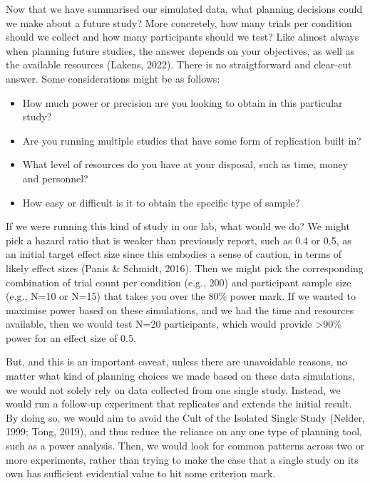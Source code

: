 \documentclass[
  english,
  man, donotrepeattitle,floatsintext]{apa6}
\providecommand{\tightlist}{%
  \setlength{\itemsep}{0pt}\setlength{\parskip}{0pt}}
\begin{document}
Now that we have summarised our simulated data, what planning decisions could we make about a future study?
More concretely, how many trials per condition should we collect and how many participants should we test?
Like almost always when planning future studies, the answer depends on your objectives, as well as the available resources (Lakens, 2022).
There is no straigtforward and clear-cut answer.
Some considerations might be as follows:

\begin{itemize}
\tightlist
\item
  How much power or precision are you looking to obtain in this particular study?
\item
  Are you running multiple studies that have some form of replication built in?
\item
  What level of resources do you have at your disposal, such as time, money and personnel?
\item
  How easy or difficult is it to obtain the specific type of sample?
\end{itemize}

If we were running this kind of study in our lab, what would we do?
We might pick a hazard ratio that is weaker than previously report, such as 0.4 or 0.5, as an initial target effect size since this embodies a sense of caution, in terms of likely effect sizes (Panis \& Schmidt, 2016).
Then we might pick the corresponding combination of trial count per condition (e.g., 200) and participant sample size (e.g., N=10 or N=15) that takes you over the 80\% power mark.
If we wanted to maximise power based on these simulations, and we had the time and resources available, then we would test N=20 participants, which would provide \textgreater90\% power for an effect size of 0.5.

But, and this is an important caveat, unless there are unavoidable reasons, no matter what kind of planning choices we made based on these data simulations, we would not solely rely on data collected from one single study.
Instead, we would run a follow-up experiment that replicates and extends the initial result.
By doing so, we would aim to avoid the Cult of the Isolated Single Study (Nelder, 1999; Tong, 2019), and thus reduce the reliance on any one type of planning tool, such as a power analysis.
Then, we would look for common patterns across two or more experiments, rather than trying to make the case that a single study on its own has sufficient evidential value to hit some criterion mark.
\end{document}

